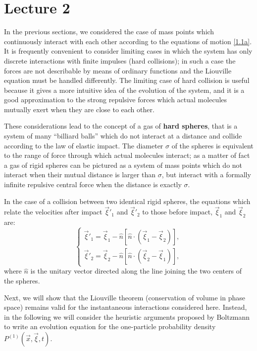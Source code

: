\newpage
\section{Lecture 2}
In the previous sections, we considered the case of mass points which continuously interact with each other according to the equations of motion \eqref{1.1a}. It is frequently convenient to consider limiting cases in which the system has only discrete interactions with finite impulses (hard collisions); in such a case the forces are not describable by means of ordinary functions and the Liouville equation must be handled differently. The limiting case of hard collision is useful because it gives a more intuitive idea of the evolution of the system, and it is a good approximation to the strong repulsive forces which actual molecules mutually exert when they are close to each other. 

These considerations lead to the concept of a gas of \textbf{hard spheres}, that is a system of many ``billiard balls'' which do not interact at a distance and collide according to the law of elastic impact. The diameter \(\sigma\) of the spheres is equivalent to the range of force through which actual molecules interact; as a matter of fact a gas of rigid spheres can be pictured as a system of mass points which do not interact when their mutual distance is larger than \(\sigma\), but interact with a formally infinite repulsive central force when the distance is exactly \(\sigma\). 

In the case of a collision between two identical rigid spheres, the equations which relate the velocities after impact \(\vec{\xi}'_1\) and \(\vec{\xi}'_2\) to those before impact, \(\vec{\xi}_1\) and \(\vec{\xi}_2\) are:
\begin{equation}
    \begin{cases}
        \vec{\xi}'_1 = \vec{\xi}_1 - \hat{n} \left[ \hat{n} \cdot \left( \vec{\xi}_1 - \vec{\xi}_2 \right) \right], \\ 
        \vec{\xi}'_2 = \vec{\xi}_2 - \hat{n} \left[ \hat{n} \cdot \left( \vec{\xi}_2 - \vec{\xi}_1 \right) \right],
    \end{cases}
    \label{4.3}
\end{equation}
where \(\hat{n}\) is the unitary vector directed along the line joining the two centers of the spheres.

Next, we will show that the Liouville theorem (conservation of volume in phase space) remains valid for the instantaneous interactions considered here. Instead, in the following we will consider the heuristic arguments proposed by Boltzmann to write an evolution equation for the one-particle probability density \(P^{(1)}(\vec{x}, \vec{\xi}, t)\).

